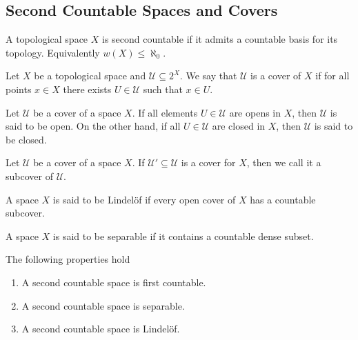 \subsection{Second Countable Spaces and Covers}

\begin{definition}\label{def: second countable}
  A topological space \(X\) is second countable if it admits a countable basis
  for its topology. Equivalently \(w(X) \leq \aleph_0\).
\end{definition}

\begin{definition}[Cover]\label{def: cover}
  Let \(X\) be a topological space and \(\mathcal U \subseteq 2^X\). We say that
  \(\mathcal U\) is a cover of \(X\) if for all points \(x \in X\) there exists
  \(U \in \mathcal U\) such that \(x \in U\).
\end{definition}

\begin{definition}
  Let \(\mathcal U\) be a cover of a space \(X\). If all elements \(U \in
  \mathcal U\) are opens in \(X\), then \(\mathcal U\) is said to be open. On
  the other hand, if all \(U \in \mathcal U\) are closed in \(X\), then
  \(\mathcal U\) is said to be closed. 
\end{definition}

\begin{definition}[Subcover]
  Let \(\mathcal U\) be a cover of a space \(X\). If \(\mathcal U' \subseteq
  \mathcal U\) is a cover for \(X\), then we call it a subcover of \(\mathcal
  U\).
\end{definition}

\begin{definition}
  A space \(X\) is said to be Lindelöf if every open cover of \(X\) has a
  countable subcover.
\end{definition}

\begin{definition}
  A space \(X\) is said to be separable if it contains a countable dense subset.
\end{definition}

\begin{proposition}
  \label{prop: second countable properties}
  The following properties hold
  \begin{enumerate}[(SC1)]
    \item A second countable space is first countable.
    \item A second countable space is separable.
    \item A second countable space is Lindelöf.
  \end{enumerate}  
\end{proposition}

